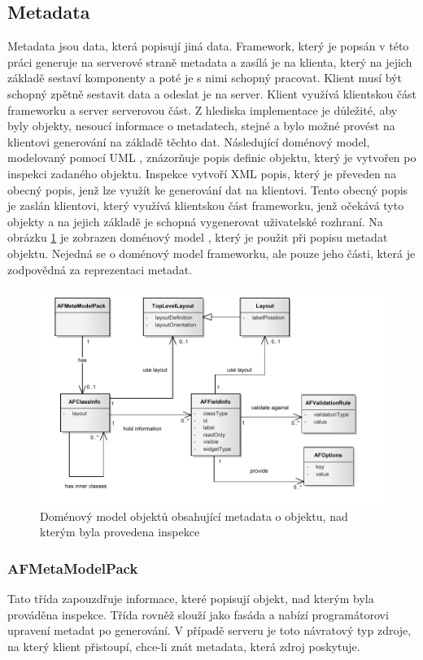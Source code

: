 \subsection{Metadata}
Metadata \cite{metadata} jsou data, která popisují jiná data. Framework, který je popsán v této práci generuje na serverové straně metadata a zasílá je na klienta, který na jejich základě sestaví komponenty a poté je s nimi schopný pracovat. Klient musí být schopný zpětně sestavit data a odeslat je na server. Klient využívá klientskou část frameworku a server serverovou část. Z hlediska implementace je důležité, aby byly objekty, nesoucí informace o metadatech, stejné a bylo možné provést na klientovi generování na základě těchto dat.
Následující doménový model, modelovaný pomocí UML \cite{UmlArlow}, znázorňuje popis definic objektu, který je vytvořen po inspekci zadaného objektu. Inspekce vytvoří XML popis, který je převeden na obecný popis, jenž lze využít ke generování dat na klientovi. Tento obecný popis je zaslán klientovi, který využívá klientskou část frameworku, jenž očekává tyto objekty a na jejich základě je schopná vygenerovat uživatelské rozhraní. Na obrázku \ref{img:metadataModel} je zobrazen doménový model \cite{UmlArlow}, který je použit při popisu metadat objektu. Nejedná se o doménový model frameworku, ale pouze jeho části, která je zodpovědná za reprezentaci metadat. 

\begin{figure}[h!]
\includegraphics{images/domainModel}
\caption{Doménový model objektů obsahující metadata o objektu, nad kterým byla provedena inspekce}
\label{img:metadataModel}
\end{figure}

\subsubsection{AFMetaModelPack}
Tato třída zapouzdřuje informace, které popisují objekt, nad kterým byla prováděna inspekce. Třída rovněž slouží jako fasáda a nabízí programátorovi upravení metadat po generování. V případě serveru je toto návratový typ zdroje, na který klient přistoupí, chce-li znát metadata, která zdroj poskytuje.
